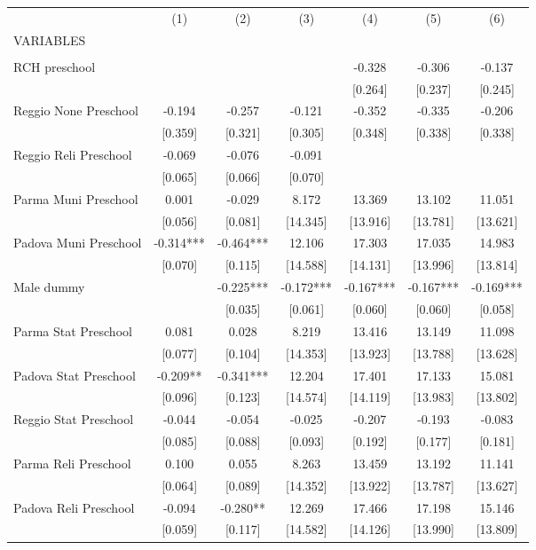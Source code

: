\begin{tabular}{lcccccc} \hline
 & (1) & (2) & (3) & (4) & (5) & (6) \\
VARIABLES &  &  &  &  &  &  \\ \hline
 &  &  &  &  &  &  \\
RCH preschool &  &  &  & -0.328 & -0.306 & -0.137 \\
 &  &  &  & [0.264] & [0.237] & [0.245] \\
Reggio None Preschool & -0.194 & -0.257 & -0.121 & -0.352 & -0.335 & -0.206 \\
 & [0.359] & [0.321] & [0.305] & [0.348] & [0.338] & [0.338] \\
Reggio Reli Preschool & -0.069 & -0.076 & -0.091 &  &  &  \\
 & [0.065] & [0.066] & [0.070] &  &  &  \\
Parma Muni Preschool & 0.001 & -0.029 & 8.172 & 13.369 & 13.102 & 11.051 \\
 & [0.056] & [0.081] & [14.345] & [13.916] & [13.781] & [13.621] \\
Padova Muni Preschool & -0.314*** & -0.464*** & 12.106 & 17.303 & 17.035 & 14.983 \\
 & [0.070] & [0.115] & [14.588] & [14.131] & [13.996] & [13.814] \\
Male dummy &  & -0.225*** & -0.172*** & -0.167*** & -0.167*** & -0.169*** \\
 &  & [0.035] & [0.061] & [0.060] & [0.060] & [0.058] \\
Parma Stat Preschool & 0.081 & 0.028 & 8.219 & 13.416 & 13.149 & 11.098 \\
 & [0.077] & [0.104] & [14.353] & [13.923] & [13.788] & [13.628] \\
Padova Stat Preschool & -0.209** & -0.341*** & 12.204 & 17.401 & 17.133 & 15.081 \\
 & [0.096] & [0.123] & [14.574] & [14.119] & [13.983] & [13.802] \\
Reggio Stat Preschool & -0.044 & -0.054 & -0.025 & -0.207 & -0.193 & -0.083 \\
 & [0.085] & [0.088] & [0.093] & [0.192] & [0.177] & [0.181] \\
Parma Reli Preschool & 0.100 & 0.055 & 8.263 & 13.459 & 13.192 & 11.141 \\
 & [0.064] & [0.089] & [14.352] & [13.922] & [13.787] & [13.627] \\
Padova Reli Preschool & -0.094 & -0.280** & 12.269 & 17.466 & 17.198 & 15.146 \\
 & [0.059] & [0.117] & [14.582] & [14.126] & [13.990] & [13.809] \\

\end{tabular}
